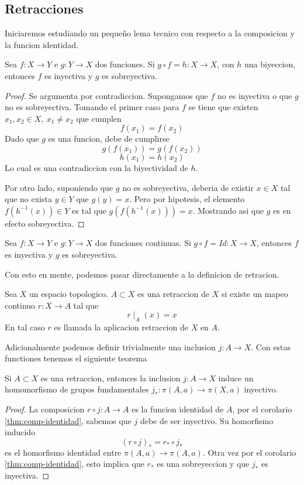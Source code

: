 \subsection{Retracciones}
Iniciaremos estudiando un pequeño lema tecnico con respecto a la
composicion y la funcion identidad.
\begin{lema}
  Sea \(f : X \to Y\) e \(g : Y \to X\) dos funciones. Si \( g \circ f =
  h : X \to X \), con \(h\) una biyeccion, entonces \(f\) es inyectiva y
  \(g\) es sobreyectiva.
\end{lema}
\begin{proof}
  Se argumenta por contradiccion. Supongamos que \(f\) no es inyectiva o
  que \(g\) no es sobreyectiva. Tomando el primer caso para \(f\) se
  tiene que existen \(x_1 , x_2 \in X,\ x_1 \neq x_2\) que cumplen
  \[ f (x_1) = f(x_2) \]
  Dado que \(g\) es una funcion, debe de cumplirse
  \[ g (f (x_1)) = g (f(x_2)) \]
  \[ h (x_1) = h(x_2) \]
  Lo cual es una contradiccion con la biyectividad de \(h\).

  Por otro lado, suponiendo que \(g\) no es sobreyectiva, deberia de
  existir \(x \in X\) tal que no exista \( y \in Y\) que \(g (y) = x\).
  Pero por hipotesis, el elemento \(f(h^{-1}(x)) \in Y\) es tal que \(g
  (f (h^{-1}(x))) = x\). Mostrando asi que \(g\) es en efecto
  sobreyectiva.
\end{proof}
\begin{corolario} \label{thm:comp-identidad}
  Sea \(f : X \to Y\) e \(g : Y \to X\) dos funciones continuas. Si \( g
  \circ f = Id : X \to X \), entonces \(f\) es inyectiva y \(g\) es
sobreyectiva.
\end{corolario}
\noindent Con esto en mente, podemos pasar directamente a la definicion
de retracion.
\begin{definicion}
  Sea \(X\) un espacio topologico. \(A \subset X\) es una retraccion de
  \(X\) si existe un mapeo continuo \(r : X \to A\) tal que
  \[ r \mid_{A} (x) = x \]
  En tal caso \(r\) es llamada la aplicacion retraccion de \(X\) en \(A\).
\end{definicion}
Adicionalmente podemos definir trivialmente una inclusion \(j : A \to
X\). Con estas functiones tenemos el siguiente teorema
\begin{teorema} \label{thm:retraccion-inclusion}
Si \(A \subset X\) es una retraccion, entonces la inclusion \(j : A \to
X\) induce un homomorfismo de grupos fundamentales \(j_{*} : \pi(A, a)
\to \pi(X,a)\) inyectivo.
\end{teorema}
\begin{proof}
  La composicion \(r \circ j : A \to A\) es la funcion identidad de
  \(A\), por el corolario \ref{thm:comp-identidad}, sabemos que \(j\)
  debe de ser inyectivo. Su homorfismo inducido
  \[ (r \circ j)_{*} = r_{*} \circ j_{*} \]
  es el homorfismo identidad entre \(\pi(A,a) \to \pi(A,a)\). Otra vez
  por el corolario \ref{thm:comp-identidad}, esto implica que \(r_{*}\)
  es una sobreyeccion y que \(j_{*}\) es inyectiva.
\end{proof}
